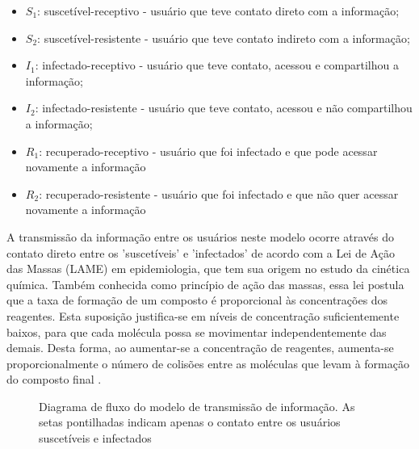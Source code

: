 \documentclass[
	12pt,				%
	openright,			%
	oneside,			%
	a4paper,			%
	english,			%
	french,				%
	spanish,			%
	brazil				%
	]{abntex2}
\begin{document}
\begin{itemize}
\item $S_1$: suscetível-receptivo - usuário que teve contato direto com a informação;
\item $S_2$: suscetível-resistente - usuário que teve contato indireto com a informação;
\item $I_1$: infectado-receptivo - usuário que teve contato, acessou e compartilhou a informação;
\item $I_2$: infectado-resistente - usuário que teve contato, acessou e não compartilhou a informação;
\item $R_1$: recuperado-receptivo - usuário que foi infectado e que pode acessar novamente a informação
\item $R_2$: recuperado-resistente - usuário que foi infectado e que não quer acessar novamente a informação
\end{itemize}

A transmissão da informação entre os usuários neste modelo ocorre
através do contato direto entre os 'suscetíveis' e 'infectados' de
acordo com a Lei de Ação das Massas (LAME) em epidemiologia, que tem
sua origem no estudo da cinética química. Também conhecida como
princípio de ação das massas, essa lei postula que a taxa de formação
de um composto é proporcional às concentrações dos reagentes. Esta
suposição justifica-se em níveis de concentração suficientemente
baixos, para que cada molécula possa se movimentar independentemente
das demais. Desta forma, ao aumentar-se a concentração de reagentes,
aumenta-se proporcionalmente o número de colisões entre as moléculas
que levam à formação do composto final \cite{coutinho2004}.

\begin{center}
    \begin{figure}
      \begin{center}
        \setlength\fboxsep{0pt}
        \setlength\fboxrule{0pt}
        \caption{Diagrama de fluxo do modelo de transmissão de
          informação. As setas pontilhadas indicam apenas o contato
          entre os usuários suscetíveis e infectados}
        \label{fig:diagramadefluxo}
      \end{center}
    \end{figure}
\end{center}
\end{document}
